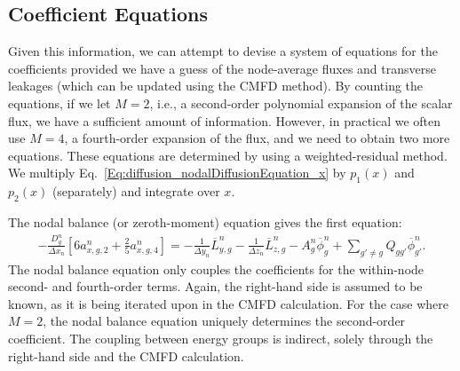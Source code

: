 %




\subsection{Coefficient Equations}

Given this information, we can attempt to devise a system of equations for the coefficients provided we have a guess of the node-average fluxes and transverse leakages (which can be updated using the CMFD method). By counting the equations, if we let $M = 2$, i.e., a second-order polynomial expansion of the scalar flux, we have a sufficient amount of information. However, in practical we often use $M = 4$, a fourth-order expansion of the flux, and we need to obtain two more equations. These equations are determined by using a weighted-residual method. We multiply Eq.~\eqref{Eq:diffusion_nodalDiffusionEquation_x} by $p_1(x)$ and $p_2(x)$ (separately) and integrate over $x$. 

The nodal balance (or zeroth-moment) equation gives the first equation:
\begin{align}
  -\frac{ D_g^n }{ \Delta x_n } \left[ 6 a_{x,g,2}^n + \frac{2}{5} a_{x,g,4}^n \right] = -\frac{1}{\Delta y_n} \overline{L}_{y,g}^n - \frac{1}{\Delta z_n} \overline{L}_{z,g}^n - A_g^n \overline{\phi}_g^n + \sum_{g' \ne g} Q_{gg'} \overline{\phi}_{g'}^n . \label{Eq:diffusion_nodalBalance_coefficients}
\end{align}
The nodal balance equation only couples the coefficients for the within-node second- and fourth-order terms. Again, the right-hand side is assumed to be known, as it is being iterated upon in the CMFD calculation. For the case where $M = 2$, the nodal balance equation uniquely determines the second-order coefficient. The coupling between energy groups is indirect, solely through the right-hand side and the CMFD calculation. 

